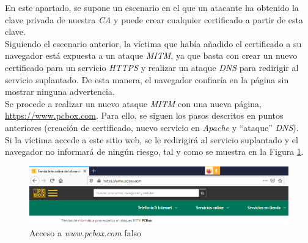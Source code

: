 \documentclass[10pt,a4paper]{article}
\begin{document}
En este apartado, se supone un escenario en el que un atacante ha obtenido la clave privada de nuestra \emph{CA} y puede crear cualquier certificado a partir de esta clave.\\

Siguiendo el escenario anterior, la víctima que había añadido el certificado a su navegador está expuesta a un ataque \textit{MITM}, ya que basta con crear un nuevo certificado para un servicio \textit{HTTPS} y realizar un ataque \emph{DNS} para redirigir al servicio suplantado. De esta manera, el navegador confiaría en la página sin mostrar ninguna advertencia.\\

Se procede a realizar un nuevo ataque \textit{MITM} con una nueva página, \url{https://www.pcbox.com}. Para ello, se siguen los pasos descritos en puntos anteriores (creación de certificado, nuevo servicio en \emph{Apache} y ``ataque'' \emph{DNS}). \\

Si la víctima accede a este sitio web, se le redirigirá al servicio suplantado y el navegador no informará de ningún riesgo, tal y como se muestra en la Figura \ref{fig:Tarea6}.\\

\begin{figure}[h!]
	\centering
	\includegraphics[scale=0.5]{images/Tarea6.png}
	\caption{Acceso a \textit{www.pcbox.com} falso}
	\label{fig:Tarea6}
\end{figure}
\end{document}
